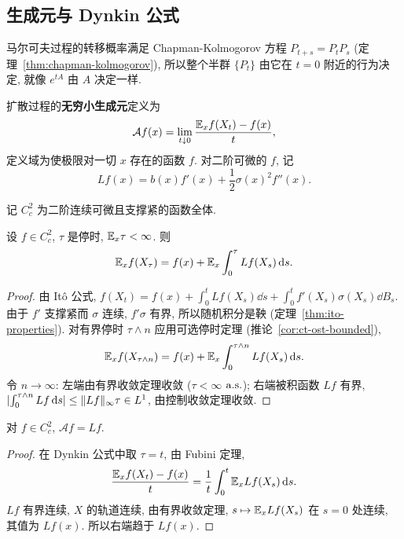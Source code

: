 \subsection{生成元与 Dynkin 公式}

马尔可夫过程的转移概率满足 Chapman-Kolmogorov 方程 $P_{t+s}=P_tP_s$ (定理~\ref{thm:chapman-kolmogorov}), 所以整个半群 $\{P_t\}$ 由它在 $t=0$ 附近的行为决定, 就像 $e^{tA}$ 由 $A$ 决定一样.

\begin{definition}[生成元]\label{def:generator}
扩散过程的\textbf{无穷小生成元}定义为
\[
\mathcal{A}f(x)=\lim_{t\downarrow0}\frac{\mathbb{E}_xf(X_t)-f(x)}{t},
\]
定义域为使极限对一切 $x$ 存在的函数 $f$. 对二阶可微的 $f$, 记
\begin{equation}\label{eq:L-operator}
Lf(x)=b(x)f'(x)+\frac{1}{2}\sigma(x)^2f''(x).
\end{equation}
\end{definition}

记 $C^2_c$ 为二阶连续可微且支撑紧的函数全体.

\begin{proposition}[Dynkin 公式]\label{prop:dynkin}
设 $f\in C^2_c$, $\tau$ 是停时, $\mathbb{E}_x\tau<\infty$. 则
\[
\mathbb{E}_xf(X_\tau)=f(x)+\mathbb{E}_x\int_0^\tau Lf(X_s)\mathop{}\!\mathrm{d} s.
\]
\end{proposition}

\begin{proof}
由 It\^o 公式, $f(X_t)=f(x)+\int_0^tLf(X_s)\dd s+\int_0^tf'(X_s)\sigma(X_s)\dd B_s$. 由于 $f'$ 支撑紧而 $\sigma$ 连续, $f'\sigma$ 有界, 所以随机积分是鞅 (定理~\ref{thm:ito-properties}). 对有界停时 $\tau\wedge n$ 应用可选停时定理 (推论~\ref{cor:ct-ost-bounded}),
\[
\mathbb{E}_xf(X_{\tau\wedge n})=f(x)+\mathbb{E}_x\int_0^{\tau\wedge n}Lf(X_s)\mathop{}\!\mathrm{d} s.
\]
令 $n\to\infty$: 左端由有界收敛定理收敛 ($\tau<\infty$ $\text{a.s.}$); 右端被积函数 $Lf$ 有界, $\lvert\int_0^{\tau\wedge n}Lf\mathop{}\!\mathrm{d} s\rvert\le\lVert Lf\rVert_\infty\tau\in L^1$, 由控制收敛定理收敛.
\end{proof}

\begin{corollary}[生成元的形式]\label{cor:generator}
对 $f\in C^2_c$, $\mathcal{A}f=Lf$.
\end{corollary}

\begin{proof}
在 Dynkin 公式中取 $\tau=t$, 由 Fubini 定理,
\[
\frac{\mathbb{E}_xf(X_t)-f(x)}{t}=\frac{1}{t}\int_0^t\mathbb{E}_xLf(X_s)\mathop{}\!\mathrm{d} s.
\]
$Lf$ 有界连续, $X$ 的轨道连续, 由有界收敛定理, $s\mapsto\mathbb{E}_xLf(X_s)$ 在 $s=0$ 处连续, 其值为 $Lf(x)$. 所以右端趋于 $Lf(x)$.
\end{proof}

